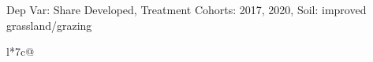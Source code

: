 \begin{table}[H]
\captionlistentry[table]{}
\label{table:beaver_land_class_DVis_land_class_3_SCg23_SSIGRG}
\scriptsize %
Dep Var: Share Developed, Treatment Cohorts: 2017, 2020, Soil: improved grassland/grazing \\
\begin{threeparttable}
\begin{tabulary}{\textwidth}{l*{7}{c}@{}}
\toprule \toprule
\noalign{\smallskip}
\noalign{\smallskip}
\midrule \bottomrule
\end{tabulary}
\medskip
\end{threeparttable}
\end{table}
